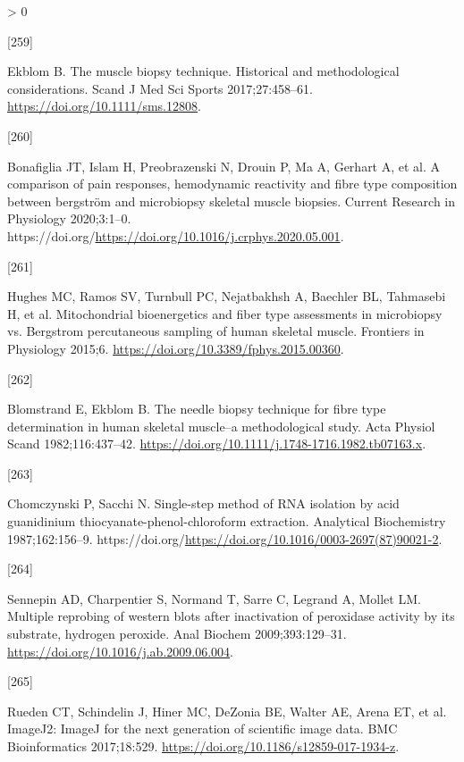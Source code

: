 \documentclass[twoside,10pt]{gihclass} %
\newlength{\cslhangindent}
\newlength{\csllabelwidth}
\newenvironment{CSLReferences}[3] %
 {%
  \setlength{\parindent}{0pt}
  \ifodd #1 \everypar{\setlength{\hangindent}{\cslhangindent}}\ignorespaces\fi
  \ifnum #2 > 0
  \setlength{\parskip}{#2\baselineskip}
  \fi
 }%
 {}
\newcommand{\CSLLeftMargin}[1]{\parbox[t]{\maxof{\widthof{#1}}{\csllabelwidth}}{#1}}
\newcommand{\CSLRightInline}[1]{\parbox[t]{\linewidth}{#1}}
\begin{document}
\begin{CSLReferences}{0}{0}
\leavevmode\hypertarget{ref-RN2549}{}%
\CSLLeftMargin{{[}259{]} }
\CSLRightInline{Ekblom B. The muscle biopsy technique. Historical and methodological considerations. Scand J Med Sci Sports 2017;27:458--61. \url{https://doi.org/10.1111/sms.12808}.}

\leavevmode\hypertarget{ref-RN2553}{}%
\CSLLeftMargin{{[}260{]} }
\CSLRightInline{Bonafiglia JT, Islam H, Preobrazenski N, Drouin P, Ma A, Gerhart A, et al. A comparison of pain responses, hemodynamic reactivity and fibre type composition between bergström and microbiopsy skeletal muscle biopsies. Current Research in Physiology 2020;3:1--0. https://doi.org/\url{https://doi.org/10.1016/j.crphys.2020.05.001}.}

\leavevmode\hypertarget{ref-RN2552}{}%
\CSLLeftMargin{{[}261{]} }
\CSLRightInline{Hughes MC, Ramos SV, Turnbull PC, Nejatbakhsh A, Baechler BL, Tahmasebi H, et al. Mitochondrial bioenergetics and fiber type assessments in microbiopsy vs. Bergstrom percutaneous sampling of human skeletal muscle. Frontiers in Physiology 2015;6. \url{https://doi.org/10.3389/fphys.2015.00360}.}

\leavevmode\hypertarget{ref-RN874}{}%
\CSLLeftMargin{{[}262{]} }
\CSLRightInline{Blomstrand E, Ekblom B. The needle biopsy technique for fibre type determination in human skeletal muscle--a methodological study. Acta Physiol Scand 1982;116:437--42. \url{https://doi.org/10.1111/j.1748-1716.1982.tb07163.x}.}

\leavevmode\hypertarget{ref-RN2672}{}%
\CSLLeftMargin{{[}263{]} }
\CSLRightInline{Chomczynski P, Sacchi N. Single-step method of RNA isolation by acid guanidinium thiocyanate-phenol-chloroform extraction. Analytical Biochemistry 1987;162:156--9. https://doi.org/\url{https://doi.org/10.1016/0003-2697(87)90021-2}.}

\leavevmode\hypertarget{ref-RN1930}{}%
\CSLLeftMargin{{[}264{]} }
\CSLRightInline{Sennepin AD, Charpentier S, Normand T, Sarre C, Legrand A, Mollet LM. Multiple reprobing of western blots after inactivation of peroxidase activity by its substrate, hydrogen peroxide. Anal Biochem 2009;393:129--31. \url{https://doi.org/10.1016/j.ab.2009.06.004}.}

\leavevmode\hypertarget{ref-RN2259}{}%
\CSLLeftMargin{{[}265{]} }
\CSLRightInline{Rueden CT, Schindelin J, Hiner MC, DeZonia BE, Walter AE, Arena ET, et al. ImageJ2: ImageJ for the next generation of scientific image data. BMC Bioinformatics 2017;18:529. \url{https://doi.org/10.1186/s12859-017-1934-z}.}


\end{CSLReferences}
\end{document}
